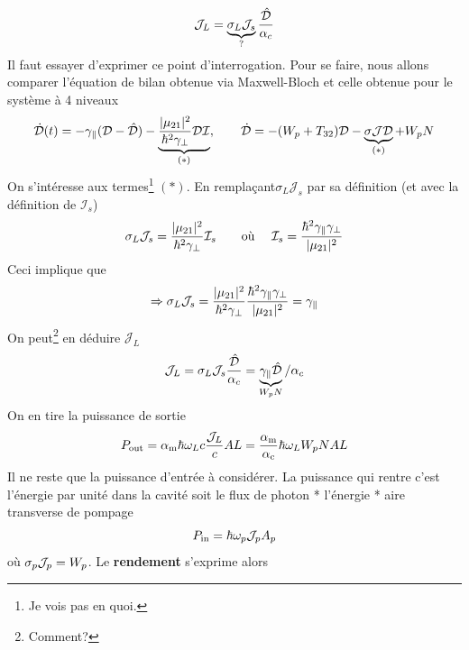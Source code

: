 \begin{equation}
{{{\cal J}}_L} = \underbrace{{\sigma _L}{{{\cal J}}_s}}_{?}\frac{{{\hat {\cal D}}}}{{{\alpha _c}}}
\end{equation}
Il faut essayer d'exprimer ce point d'interrogation. Pour se faire, nous allons comparer l'équation 
de bilan obtenue via Maxwell-Bloch et celle obtenue pour le système à 4 niveaux
\begin{equation}
\dot {\cal D}(t) =  - {\gamma _\parallel }({{\cal D}} - {\hat {\cal D}}) -\underbrace{\frac{{|{\mu _{21}}{|^2}}}{{{\hbar ^2}{\gamma _ \bot }}}{\cal D}{{\cal I}}}_{(*)},\qquad {\dot {\cal D}} =  - ({W_p} + {T_{32}}){{\cal D}} - \underbrace{\sigma {{\cal J}{\cal D}}}_{(*)} + {W_p}N
\end{equation}
On s'intéresse aux termes\footnote{Je vois pas en quoi.} $(*)$. En remplaçant$\sigma_L\mathcal{J}_s$
par sa définition (et avec la définition de $\mathcal{I}_s$)
\begin{equation}
{\sigma _L}{{{\cal J}}_s} = \frac{{|{\mu _{21}}{|^2}}}{{{\hbar ^2}{\gamma _ \bot }}}{{{\cal I}}_s}
\qquad\text{où }\quad {{{\cal I}}_s} = \frac{{{\hbar ^2}{\gamma _\parallel }{\gamma _ \bot }}}{{|{\mu _{21}}{|^2}}}
\end{equation}
Ceci implique que
\begin{equation}
\Rightarrow {\sigma _L}{{{\cal J}}_s} = \frac{{|{\mu _{21}}{|^2}}}{{{\hbar ^2}{\gamma _ \bot }}}\frac{{{\hbar ^2}{\gamma _\parallel }{\gamma _ \bot }}}{{|{\mu _{21}}{|^2}}} = {\gamma _\parallel }
\end{equation}
On peut\footnote{Comment?} en déduire $\mathcal{J}_L$
\begin{equation}
{{{\cal J}}_L} = {\sigma _L}{{{\cal J}}_s}\frac{{{\hat {\cal D}}}}{{{\alpha _c}}} = \underbrace{{\gamma _\parallel }{\hat {\cal D}}}_{W_pN}/{\alpha _c}
\end{equation}
On en tire la puissance de sortie
\begin{equation}
{P_{{\rm{out}}}} = {\alpha _{\rm{m}}}\hbar {\omega _L}c\frac{{{{{\cal J}}_L}}}{c}AL = \frac{{{\alpha _{\rm{m}}}}}{{{\alpha _{\rm{c}}}}}\hbar {\omega _L}{W_p}NAL
\end{equation}
Il ne reste que la puissance d'entrée à considérer. La puissance qui rentre c'est l'énergie par unité 
dans la cavité soit le flux de photon * l'énergie * aire transverse de pompage
\begin{equation}
{P_{{\rm{in}}}} = \hbar {\omega _p}{{{\cal J}}_p}{A_p}
\end{equation}
où ${\sigma _p}{{{\cal J}}_p} = {W_p}$. Le \textbf{rendement} s'exprime alors
